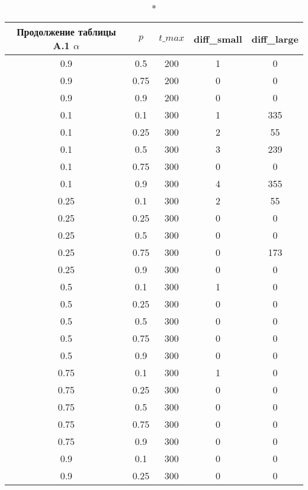 \begin{longtable}[c]{|c|c|c|c|c|}
\caption*{Продолжение таблицы A.1}
\hline
$\alpha$ & $p$ & $t\_max$ & diff\_small & diff\_large
\tabularnewline 
\hline
0.9 & 0.5 & 200 & 1 & 0 \\ 
\hline
0.9 & 0.75 & 200 & 0 & 0 \\ 
\hline
0.9 & 0.9 & 200 & 0 & 0 \\ 
\hline
0.1 & 0.1 & 300 & 1 & 335 \\ 
\hline
0.1 & 0.25 & 300 & 2 & 55 \\ 
\hline
0.1 & 0.5 & 300 & 3 & 239 \\ 
\hline
0.1 & 0.75 & 300 & 0 & 0 \\ 
\hline
0.1 & 0.9 & 300 & 4 & 355 \\ 
\hline
0.25 & 0.1 & 300 & 2 & 55 \\ 
\hline
0.25 & 0.25 & 300 & 0 & 0 \\ 
\hline
0.25 & 0.5 & 300 & 0 & 0 \\ 
\hline
0.25 & 0.75 & 300 & 0 & 173 \\ 
\hline
0.25 & 0.9 & 300 & 0 & 0 \\ 
\hline
0.5 & 0.1 & 300 & 1 & 0 \\ 
\hline
0.5 & 0.25 & 300 & 0 & 0 \\ 
\hline
0.5 & 0.5 & 300 & 0 & 0 \\ 
\hline
0.5 & 0.75 & 300 & 0 & 0 \\ 
\hline
0.5 & 0.9 & 300 & 0 & 0 \\ 
\hline
0.75 & 0.1 & 300 & 1 & 0 \\ 
\hline
0.75 & 0.25 & 300 & 0 & 0 \\ 
\hline
0.75 & 0.5 & 300 & 0 & 0 \\ 
\hline
0.75 & 0.75 & 300 & 0 & 0 \\ 
\hline
0.75 & 0.9 & 300 & 0 & 0 \\ 
\hline
0.9 & 0.1 & 300 & 0 & 0 \\ 
\hline
0.9 & 0.25 & 300 & 0 & 0 \\ 
\hline
\end{longtable}

